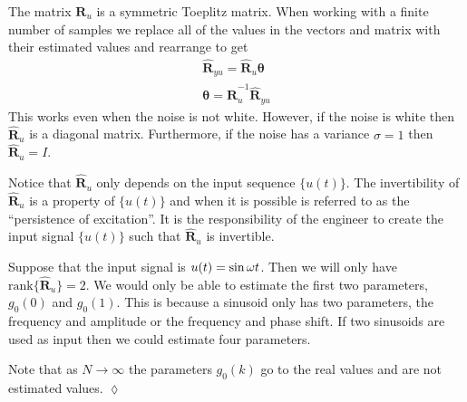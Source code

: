The matrix $\mathbf{R}_u$ is a symmetric Toeplitz matrix.
When working with a finite number of samples we replace all of the values in the vectors and matrix with their estimated values and rearrange to get
\begin{align*}
\hat{\mathbf{R}}_{yu} = \hat{\mathbf{R}}_u\mathbf{\theta} \\
\mathbf{\theta} = \hat{\mathbf{R}}_u^{-1}\hat{\mathbf{R}}_{yu}
\end{align*}
This works even when the noise is not white.
However, if the noise is white then $\hat{\mathbf{R}}_u$ is a diagonal matrix.
Furthermore, if the noise has a variance $\sigma=1$ then $\hat{\mathbf{R}}_u=I$.

Notice that $\hat{\mathbf{R}}_u$ only depends on the input sequence $\{u(t)\}$.
The invertibility of $\hat{\mathbf{R}}_u$ is a property of $\{u(t)\}$ and when it is possible is referred to as the ``persistence of excitation''.
It is the responsibility of the engineer to create the input signal $\{u(t)\}$ such that $\hat{\mathbf{R}}_u$ is invertible.

\begin{example}
Suppose that the input signal is $u(t)=\sin\omega t$.
Then we will only have $\text{rank}\{\hat{\mathbf{R}}_u\}=2$.
We would only be able to estimate the first two parameters, $g_0(0)$ and $g_0(1)$.
This is because a sinusoid only has two parameters, the frequency and amplitude or the frequency and phase shift.
If two sinusoids are used as input then we could estimate four parameters.

Note that as $N\to\infty$ the parameters $g_0(k)$ go to the real values and are not estimated values.
$\lozenge$
\end{example}
